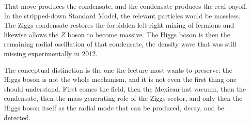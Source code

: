 That move produces the condensate, and the condensate produces the real payoff. In the stripped-down Standard Model, the relevant particles would be massless. The Ziggs condensate restores the forbidden left-right mixing of fermions and likewise allows the \(Z\) boson to become massive. The Higgs boson is then the remaining radial oscillation of that condensate, the density wave that was still missing experimentally in 2012.

The conceptual distinction is the one the lecture most wants to preserve: the Higgs boson is not the whole mechanism, and it is not even the first thing one should understand. First comes the field, then the Mexican-hat vacuum, then the condensate, then the mass-generating role of the Ziggs sector, and only then the Higgs boson itself as the radial mode that can be produced, decay, and be detected.